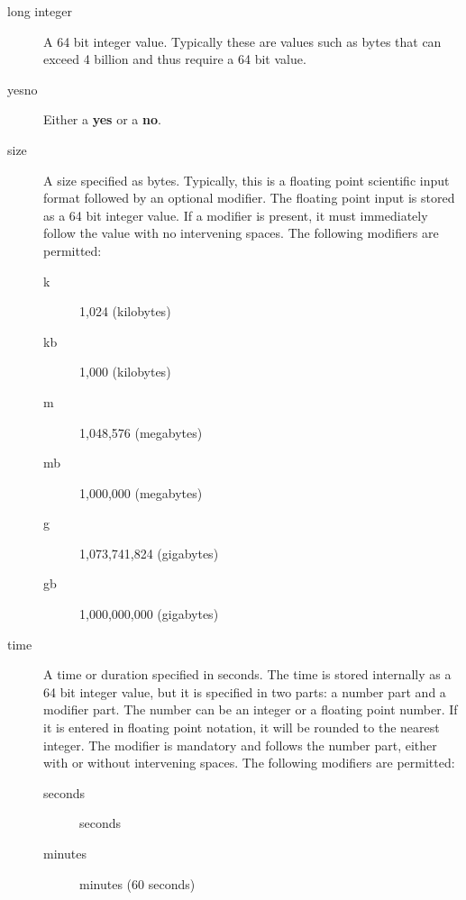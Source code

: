 \begin{description}
\item [long integer]
   A 64 bit integer value. Typically these  are values such as bytes that can
exceed 4 billion and thus  require a 64 bit value. 

\item [yes\vb{}no]
   Either a {\bf yes} or a {\bf no}. 

\label{Size1}
\item [size]
A size specified as bytes. Typically, this is  a floating point scientific
input format followed by an optional modifier. The  floating point input is
stored as a 64 bit integer value.  If a modifier is present, it must
immediately follow the  value with no intervening spaces. The following
modifiers are permitted:  

\begin{description}
\item [k]
   1,024 (kilobytes)  

\item [kb]
   1,000 (kilobytes)  

\item [m]
   1,048,576 (megabytes)  

\item [mb]
   1,000,000 (megabytes)  

\item [g]
   1,073,741,824 (gigabytes) 

\item [gb]
   1,000,000,000 (gigabytes) 
\end{description}

\label{Time}
\item [time]
A time or duration specified in seconds.  The time is stored internally as
a 64 bit integer value, but it is specified in two parts: a number part and
a modifier part.  The number can be an integer or a floating point number.
If it is entered in floating point notation, it will be rounded to the
nearest integer.  The modifier is mandatory and follows the number part,
either with or without intervening spaces.  The following modifiers are
permitted:

\begin{description}

\item [seconds]
   seconds 

\item [minutes]
   minutes (60 seconds)  


\end{description}
\end{description}
